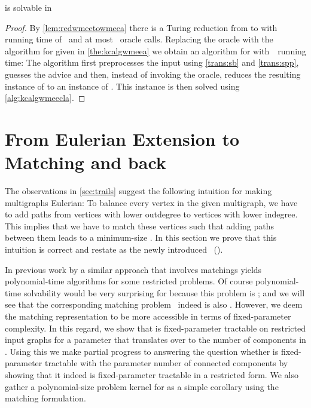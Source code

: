\begin{corollary}\label{cor:wmeefptbc}
  \pWMEE{} is solvable in~
\end{corollary}
\begin{proof}
  By \autoref{lem:redwmeetowmeea} there is a Turing reduction from \pWMEEs{} to \pWMEECAs{} with running time of~ and at most~ oracle calls. Replacing the oracle with the algorithm for \pWMEECAs{} given in \autoref{the:kcalgwmeea} we obtain an algorithm for \pWMEEs{} with~~running time: The algorithm first preprocesses the input using \autoref{trans:sb} and \autoref{trans:spp}, guesses the advice and then, instead of invoking the oracle, reduces the resulting instance of \pWMEECAs{} to an instance of \pWMEECCLAs{}. This instance is then solved using \autoref{alg:kcalgwmeecla}.
\end{proof}



\section{From Eulerian Extension to Matching and back}\label{sec:matching}

The observations in \autoref{sec:trails} suggest the following intuition for making multigraphs Eulerian: To balance every vertex in the given multigraph, we have to add paths from vertices with lower outdegree to vertices with lower indegree. This implies that we have to match these vertices such that adding paths between them leads to a minimum-size \EE. In this section we prove that this intuition is correct and restate \pWMEEs{} as the newly introduced \pCBM{}~(\pCBMs{}).

In previous work by \citet{DMNW10} a similar approach that involves matchings yields polynomial-time algorithms for some restricted \EE{} problems. Of course polynomial-time solvability would be very surprising for \pWMEEs{} because this problem is \NPh ; and we will see that the corresponding matching problem~\pCBMs{} indeed is also \NPh . However, we deem the matching representation to be more accessible in terms of fixed-parameter complexity. In this regard, we show that \pCBMs{} is fixed-parameter tractable on restricted input graphs for a parameter that translates over to the number of components in \pWMEEs{}. Using this we make partial progress to answering the question whether \pWMEEs{} is fixed-parameter tractable with the parameter number of connected components by showing that it indeed is fixed-parameter tractable in a restricted form. We also gather a polynomial-size problem kernel for \pWMEECAs{} as a simple corollary using the matching formulation.

